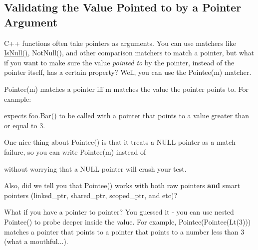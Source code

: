 \subsection*{Validating the Value Pointed to by a Pointer Argument}

C++ functions often take pointers as arguments. You can use matchers like {\ttfamily \mbox{\hyperlink{namespacetesting_1_1internal_adcfd37a66bc4cb0e8291cf46e1a6c72b}{Is\+Null()}}}, {\ttfamily Not\+Null()}, and other comparison matchers to match a pointer, but what if you want to make sure the value {\itshape pointed to} by the pointer, instead of the pointer itself, has a certain property? Well, you can use the {\ttfamily Pointee(m)} matcher.

{\ttfamily Pointee(m)} matches a pointer iff {\ttfamily m} matches the value the pointer points to. For example\+:


\begin{DoxyCode}{0}
\end{DoxyCode}


expects {\ttfamily foo.\+Bar()} to be called with a pointer that points to a value greater than or equal to 3.

One nice thing about {\ttfamily Pointee()} is that it treats a {\ttfamily N\+U\+LL} pointer as a match failure, so you can write {\ttfamily Pointee(m)} instead of


\begin{DoxyCode}{0}
\end{DoxyCode}


without worrying that a {\ttfamily N\+U\+LL} pointer will crash your test.

Also, did we tell you that {\ttfamily Pointee()} works with both raw pointers {\bfseries{and}} smart pointers ({\ttfamily linked\+\_\+ptr}, {\ttfamily shared\+\_\+ptr}, {\ttfamily scoped\+\_\+ptr}, and etc)?

What if you have a pointer to pointer? You guessed it -\/ you can use nested {\ttfamily Pointee()} to probe deeper inside the value. For example, {\ttfamily Pointee(Pointee(\+Lt(3)))} matches a pointer that points to a pointer that points to a number less than 3 (what a mouthful...).


